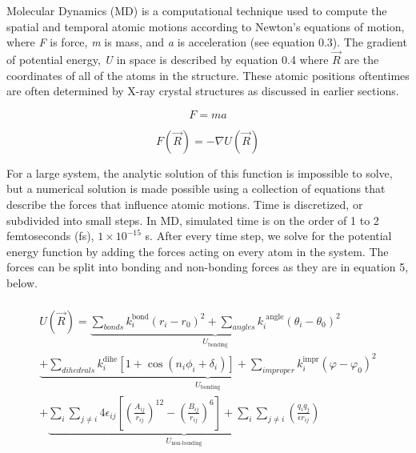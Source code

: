 \documentclass[12pt]{ucsddissertation}
\begin{document}
\begin{dissertationintroduction}
Molecular Dynamics (MD) is a computational technique used to compute the spatial and temporal atomic motions according to Newton's equations of motion, where \textit{F} is force, \textit{m} is mass, and \textit{a} is acceleration (see equation 0.3). The gradient of potential energy, \textit{U} in space is described by equation 0.4 where $\vec { R }$ are the coordinates of all of the atoms in the structure. These atomic positions oftentimes are often determined by X-ray crystal structures as discussed in earlier sections.

\begin{equation}
   F = ma
\end{equation}

\begin{equation}
   F ( \vec { R } ) = - \nabla U ( \vec { R } )
\end{equation}

For a large system, the analytic solution of this function is impossible to solve, but a numerical solution is made possible using a collection of equations that describe the forces that influence atomic motions. Time is discretized, or subdivided into small steps. In MD, simulated time is on the order of 1 to 2 femtoseconds (fs), $1\times10^{-15}$ s. After every time step, we solve for the potential energy function by adding the forces acting on every atom in the system. The forces can be split into bonding and non-bonding forces as they are in equation 5, below.  

\begin{align}
  \label{eq:eight}
   \begin{split}
    \begin{gathered}
     U ( \vec { R } ) = \underbrace { \sum _ {bonds} k _ { i } ^ \text {bond} \left( r _ { i } - r _ { 0 } \right) ^ { 2 } +  \sum _ { angles } k _ { i } ^ { \text { angle} } \left( \theta _ { i } - \theta _ { 0 } \right) ^ { 2 } }_{ U _ {\text{bonding}} }\\ \underbrace { + \sum _ { {dihedrals} } k _ { i } ^ {\text{dihe}} \left[ 1 + \cos \left( n _ { i } \phi _ { i } + \delta _ { i } \right) \right]   +  \sum _ {improper} k _ { i } ^ { \text {impr} } \left( \varphi - \varphi _ { 0 } \right) ^ { 2 }   }_{ U _ {\text{bonding}} }\\
     + \underbrace{ \sum _ { i } \sum _ { j \neq i } 4 \epsilon _ { i j } \left[ \left( \frac { A _ { i j } } { r _ { i j } } \right) ^ { 12 } - \left( \frac { B _ { i j } } { r _ { i j } } \right) ^ { 6 } \right]
      + \sum _ { i } \sum _ { j \neq i } \left(\frac {q _ { i } q _ { j } } { \epsilon r _ { i j } }\right)} _ { U _ { \text{non-bonding}}}
    \end{gathered}
  \end{split}
\end{align}



\end{dissertationintroduction}
\end{document}

